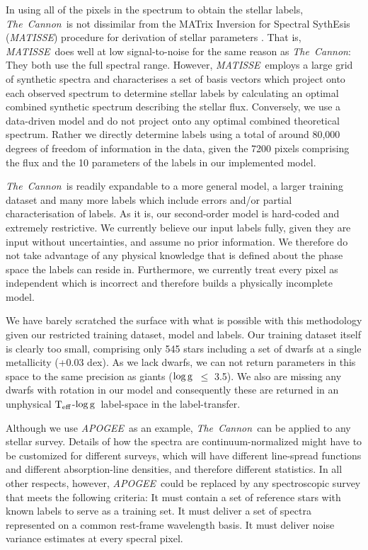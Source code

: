 \documentclass[12pt, preprint]{aastex}
\newcommand{\teff}{\mbox{$\rm T_{eff}$}}
\newcommand{\logg}{\mbox{$\rm \log g$}}
\newcommand{\tc}{\textsl{The~Cannon}}
\newcommand{\apogee}{\textsl{APOGEE}}
\newcommand{\matisse}{\textsl{MATISSE}}
\begin{document}
In using all of the pixels in the spectrum to obtain the
stellar labels, \tc\ is not dissimilar from the MATrix Inversion for
Spectral SythEsis (\matisse) procedure for derivation of stellar
parameters \citep{RB2006}.
That is, \matisse\ does well at low signal-to-noise for the same
reason as \tc:  They both use the full spectral range.
However, \matisse\ employs a large grid of synthetic spectra and
characterises a set of basis vectors which project onto each observed
spectrum to determine stellar labels by calculating an optimal
combined synthetic spectrum describing the stellar flux.
Conversely, we use a data-driven model and do not project onto any
optimal combined theoretical spectrum.
Rather we directly determine labels using a total of around 80,000
degrees of freedom of information in the data, given the 7200 pixels
comprising the flux and the 10 parameters of the labels in our
implemented model.
 
 \tc\ is readily expandable to a more general model, a larger training dataset and many more labels which include errors and/or partial characterisation of labels. As it is, our second-order model is hard-coded and extremely restrictive. We currently believe our input labels fully, given they are input without uncertainties, and assume no prior information. We therefore do not take advantage of any physical knowledge that is defined about the phase space the labels can reside in.  Furthermore, we currently treat every pixel as independent which is incorrect and therefore builds a physically incomplete model.

 We have barely scratched the surface with what is possible with this methodology given our restricted training dataset, model and labels. Our training dataset itself is clearly too small, comprising only 545 stars including a set of dwarfs at a single metallicity (+0.03 dex). As we lack dwarfs, we can not return parameters in this space to the same precision as giants (\logg\ $\le$ 3.5).  We also are missing any dwarfs with rotation in our model and consequently these are returned in an unphysical \teff-\logg\ label-space in the label-transfer. 
 
Although we use \apogee\ as an example, \tc\ can be applied to
any stellar survey.
Details of how the spectra are continuum-normalized might have to be
customized for different surveys, which will have different
line-spread functions and different absorption-line densities, and
therefore different statistics.
In all other respects, however, \apogee\ could be replaced by any spectroscopic
survey that meets the following criteria:
It must contain a set of reference stars with known labels to serve as
a training set.
It must deliver a set of spectra represented on a common rest-frame
wavelength basis.
It must deliver noise variance estimates at every specral pixel.
\end{document}
